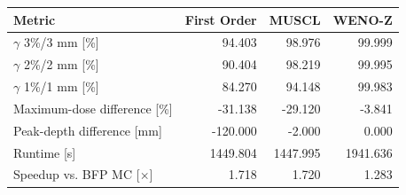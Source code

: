 \begin{tabular}{lrrr}
\toprule
Metric & First Order & MUSCL & WENO-Z \\
\midrule
$\gamma$ 3\%/3 mm [\%] & 94.403 & 98.976 & 99.999 \\
$\gamma$ 2\%/2 mm [\%] & 90.404 & 98.219 & 99.995 \\
$\gamma$ 1\%/1 mm [\%] & 84.270 & 94.148 & 99.983 \\
Maximum-dose difference [\%] & -31.138 & -29.120 & -3.841 \\
Peak-depth difference [mm] & -120.000 & -2.000 & 0.000 \\
Runtime [s] & 1449.804 & 1447.995 & 1941.636 \\
Speedup vs. BFP MC [$\times$] & 1.718 & 1.720 & 1.283 \\
\bottomrule
\end{tabular}
